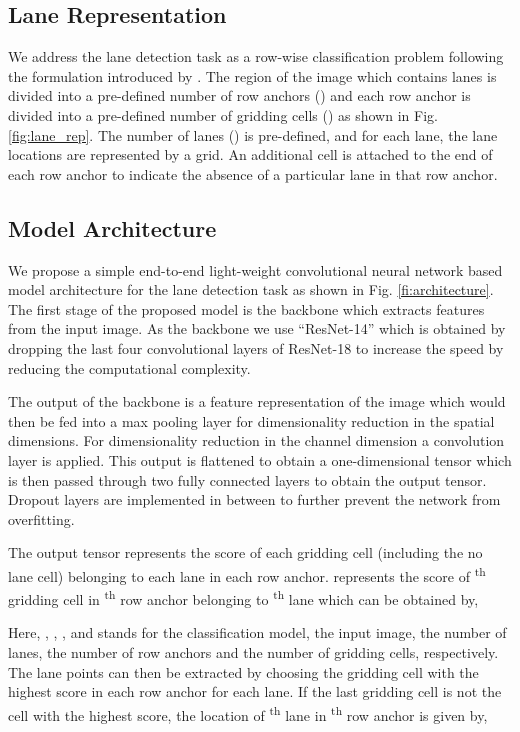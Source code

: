 \documentclass[conference]{IEEEtran}
\begin{document}
\subsection{Lane Representation}
\label{ssec:laneRep}

We address the lane detection task as a row-wise classification problem following the formulation introduced by \cite{qin2020ultra}. The region of the image which contains lanes is divided into a pre-defined number of row anchors () and each row anchor is divided into a pre-defined number of gridding cells () as shown in Fig. \ref{fig:lane_rep}. The number of lanes () is pre-defined, and for each lane, the lane locations are represented by a  grid. An additional cell is attached to the end of each row anchor to indicate the absence of a particular lane in that row anchor.

\subsection{Model Architecture}
\label{ssec:Arch}



We propose a simple end-to-end light-weight convolutional neural network based model architecture for the lane detection task as shown in Fig. \ref{fi:architecture}. The first stage of the proposed model is the backbone which extracts features from the input image. As the backbone we use ``ResNet-14'' which is obtained by dropping the last four convolutional layers of ResNet-18 \cite{he2016deep} to increase the speed by reducing the computational complexity. 

The output of the backbone is a feature representation of the image which would then be fed into a  max pooling layer for dimensionality reduction in the spatial dimensions. For dimensionality reduction in the channel dimension a  convolution layer is applied. This output is flattened to obtain a one-dimensional tensor which is then passed through two fully connected layers to obtain the output tensor. Dropout layers are implemented in between to further prevent the network from overfitting.

The output tensor represents the score of each gridding cell (including the no lane cell) belonging to each lane in each row anchor.  represents the score of \textsuperscript{th} gridding cell in \textsuperscript{th} row anchor belonging to \textsuperscript{th} lane which can be obtained by, 

\normalsize
Here, , , ,  and  stands for the classification model, the input image, the number of lanes, the number of row anchors and the number of gridding cells, respectively. The lane points can then be extracted by choosing the gridding cell with the highest score in each row anchor for each lane. If the last gridding cell is not the cell with the highest score, the location of \textsuperscript{th} lane in \textsuperscript{th} row anchor is given by, 
\end{document}
